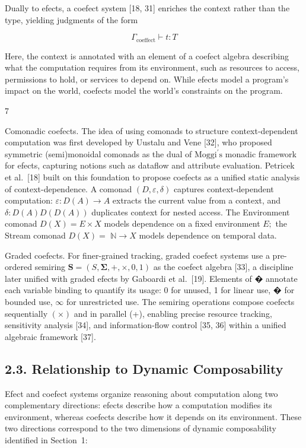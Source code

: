 \documentclass[
  10
]{article}
\begin{document}
Dually to efects, a coefect system {[}18, 31{]} enriches the context
rather than the type, yielding judgments of the form

\[
\Gamma _ { \mathrm { c o e f f e c t } } \vdash t : T\tag{3}
\]

Here, the context is annotated with an element of a coefect algebra
describing what the computation requires from its environment, such as
resources to access, permissions to hold, or services to depend on.
While efects model a program's impact on the world, coefects model the
world's constraints on the program.

7

Comonadic coefects. The idea of using comonads to structure
context-dependent computation was first developed by Uustalu and Vene
{[}32{]}, who proposed symmetric (semi)monoidal comonads as the dual of
\(\mathrm { M o g g i ^ { \prime } s }\) monadic framework for efects,
capturing notions such as dataflow and attribute evaluation. Petricek et
al.~{[}18{]} built on this foundation to propose coefects as a unified
static analysis of context-dependence. A comonad
\(( D , \varepsilon , \delta )\) captures context-dependent computation:
\(\varepsilon : D ( A ) \to A\) extracts the current value from a
context, and \(\delta : D ( A )  D ( D ( A ) )\) duplicates context for
nested access. The Environment comonad \(D ( X ) = E \times X\) models
dependence on a fixed environment \(E ;\) the Stream comonad
\(D ( X ) =\) \(\mathbb { N } \to X\) models dependence on temporal
data.

Graded coefects. For finer-grained tracking, graded coefect systems use
a pre-ordered semiring
\(\pmb { S } = ( S , \pmb { \Sigma } , + , \times , 0 , 1 )\) as the
coefect algebra {[}33{]}, a discipline later unified with graded efects
by Gaboardi et al.~{[}19{]}. Elements of � annotate each variable
binding to quantify its usage: 0 for unused, 1 for linear use, � for
bounded use, \(\infty\) for unrestricted use. The semiring operations
compose coefects sequentially \(( \times )\) and in parallel (+),
enabling precise resource tracking, sensitivity analysis {[}34{]}, and
information-flow control {[}35, 36{]} within a unified algebraic
framework {[}37{]}.

\subsection{2.3. Relationship to Dynamic
Composability}\label{relationship-to-dynamic-composability}

Efect and coefect systems organize reasoning about computation along two
complementary directions: efects describe how a computation modifies its
environment, whereas coefects describe how it depends on its
environment. These two directions correspond to the two dimensions of
dynamic composability identified in Section~1:
\end{document}
